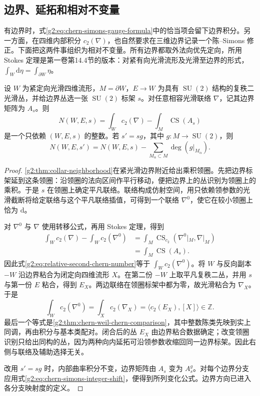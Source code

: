 \subsection{边界、延拓和相对不变量}
\label{g2:subsec:2204:03}
有边界时，式\eqref{g2:eq:chern-simons-gauge-formula}中的恰当项会留下边界积分。另一方面，在四维内部积分 \(c_2(\nabla)\)，也自然要求在三维边界记录一个陈--Simons 修正。下面把这两件事组织为相对不变量。所有边界都取外法向优先定向，所用 Stokes 定理是第一卷第14.4节的版本：对紧有向光滑流形及光滑至边界的形式，\(\int_W\mathrm d\eta=\int_{\partial W}\eta\)。

\begin{proposition}\label{g2:prop:relative-chern-simons-integer}
	设 \(W\) 为紧定向光滑四维流形，\(M=\partial W\)，\(E\to W\) 为具有 \(\operatorname{SU}(2)\) 结构的复秩二光滑丛，并给边界丛选一张 \(\operatorname{SU}(2)\) 标架 \(s\)。对任意相容光滑联络 \(\nabla\)，记其边界矩阵为 \(A_s\)。则
	\begin{equation}\label{g2:eq:relative-second-chern-number}
		N(W,E,s)=\int_W c_2(\nabla)-\int_M\operatorname{CS}(A_s)
	\end{equation}
	是一个只依赖 \((W,E,s)\) 的整数。若 \(s'=sg\)，其中 \(g:M\to\operatorname{SU}(2)\)，则
	\[
		N(W,E,s')=N(W,E,s)-\sum_{M_\alpha\subset M}\deg(g|_{M_\alpha}).
	\]
\end{proposition}
\begin{proof}
	\cref{g2:thm:collar-neighborhood}在紧光滑边界附近给出乘积领圈。先把边界标架延到这条领圈：沿领圈的法向区间作平行移动，便把边界上的丛识别为领圈上的乘积。于是 \(s\) 在领圈上确定平凡联络。联络构成仿射空间，用只依赖领参数的光滑截断将给定联络与这个平凡联络插值，可得到一个联络 \(\nabla^0\)，使它在较小领圈上恰为 \(\mathrm d\)。

	对 \(\nabla^0\) 与 \(\nabla\) 使用转移公式，再用 Stokes 定理，得到
	\[
	\begin{aligned}
		\int_Wc_2(\nabla)-\int_Wc_2(\nabla^0)
		&=\int_M\operatorname{CS}_{c_2}(\nabla^0|_M,\nabla|_M)\\
		&=\int_M\operatorname{CS}(A_s).
	\end{aligned}
	\]
	因此式\eqref{g2:eq:relative-second-chern-number}等于 \(\int_Wc_2(\nabla^0)\)。将 \(W\) 与反向副本 \(-W\) 沿边界粘合为闭定向四维流形 \(X\)。在第二份 \(-W\) 上取平凡复秩二丛，并用 \(s\) 与第一份 \(E\) 粘合，得到 \(E_X\)。两边联络在领圈标架中都为零，故光滑粘合为 \(\nabla_X\)。于是
	\[
		\int_Wc_2(\nabla^0)=\int_Xc_2(\nabla_X)
		=\langle c_2(E_X),[X]\rangle\in\mathbb Z.
	\]
	最后一个等式是\cref{g2:thm:chern-weil-chern-comparison}，其中整数陈类先映到实上同调，再由积分与基本类配对。闭合后的丛 \(E_X\) 由边界粘合数据确定；改变领圈识别只给出同构的丛，因为两种向内延拓可沿领参数收缩回同一边界标架。因此右侧与联络及辅助选择无关。

	改用 \(s'=sg\) 时，内部曲率积分不变，边界矩阵由 \(A_s\) 变为 \(A_s^g\)。对每个边界分支应用式\eqref{g2:eq:chern-simons-integer-shift}，便得到所列变化公式。边界方向已进入各分支映射度的定义。
\end{proof}

